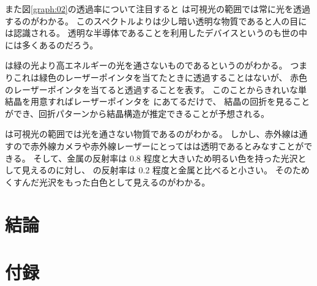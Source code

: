 \documentclass[11pt,dvipdfmx,a4paper]{jsarticle}
\begin{document}
また図\ref{graph:02}の透過率について注目すると
は可視光の範囲では常に光を透過するのがわかる。
このスペクトルよりは少し暗い透明な物質であると人の目には認識される。
透明な半導体であることを利用したデバイスというのも世の中には多くあるのだろう。

 は緑の光より高エネルギーの光を通さないものであるというのがわかる。
つまりこれは緑色のレーザーポインタを当てたときに透過することはないが、
赤色のレーザーポインタを当てると透過することを表す。
このことからきれいな単結晶を用意すればレーザーポインタを  にあてるだけで、
結晶の回折を見ることができ、回折パターンから結晶構造が推定できることが予想される。

 は可視光の範囲では光を通さない物質であるのがわかる。
しかし、赤外線は通すので赤外線カメラや赤外線レーザーにとってはは透明であるとみなすことができる。
そして、金属の反射率は 0.8 程度と大きいため明るい色を持った光沢として見えるのに対し、
 の反射率は 0.2 程度と金属と比べると小さい。
そのためくすんだ光沢をもった白色として見えるのがわかる。

\section{結論}




\section*{付録}
\end{document}
